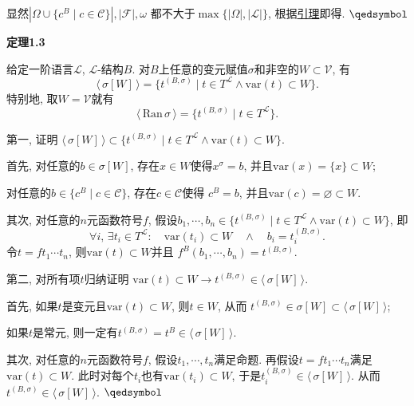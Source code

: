\documentclass[UTF8]{ctexart}
\begin{document}
显然$|\Omega\cup\{c^B\mid c\in\mathcal{C}\}|, |\mathcal{F}|, \omega$
都不大于$\max\{|\Omega|,|\mathcal{L}|\}$,
根据\href{../../01 一阶语言/01 一阶语言#nameddest=sec:定理A1.1}{引理}即得.
\hfill $\qedsymbol$

\vspace{10pt}

\hypertarget{sec:定理1.3}{}
\noindent\textbf{定理1.3}

给定一阶语言$\mathcal{L}$, $\mathcal{L}$-结构$B$.
对$B$上任意的变元赋值$\sigma$和非空的$W\subset\mathcal{V}$, 有
\[
    \langle\,\sigma[W]\,\rangle=\{t^{(B,\sigma)}\mid
    t\in T^{\mathcal{L}}\land\mathrm{var}(t)\subset W\}.
\]
特别地, 取$W=\mathcal{V}$就有
\[
    \langle\,\mathrm{Ran}\,\sigma\,\rangle=
    \{t^{(B,\sigma)}\mid t\in T^{\mathcal{L}}\}.
\]


第一, 证明
$\langle\,\sigma[W]\,\rangle\subset\{t^{(B,\sigma)}\mid
t\in T^{\mathcal{L}}\land\mathrm{var}(t)\subset W\}$.

首先, 对任意的$b\in\sigma[W]$, 存在$x\in W$使得$x^\sigma=b$,
并且$\mathrm{var}(x)=\{x\}\subset W$;

对任意的$b\in\{c^B\mid c\in\mathcal{C}\}$, 存在$c\in\mathcal{C}$使得
$c^B=b$, 并且$\mathrm{var}(c)=\varnothing\subset W$.

其次, 对任意的$n$元函数符号$f$, 假设$b_1,\cdots,b_n\in\{t^{(B,\sigma)}\mid
t\in T^{\mathcal{L}}\land\mathrm{var}(t)\subset W\}$, 即
\[
    \forall i,\,\exists t_i\in T^{\mathcal{L}}:\quad
    \mathrm{var}(t_i)\subset W\quad\land\quad b_i=t_i^{(B,\sigma)}.
\]
令$t=ft_1\cdots t_n$, 则$\mathrm{var}(t)\subset W$并且
$f^B(b_1,\cdots,b_n)=t^{(B,\sigma)}$.

第二, 对所有项$t$归纳证明
$\mathrm{var}(t)\subset W\to t^{(B,\sigma)}\in\langle\,\sigma[W]\,\rangle$.

首先, 如果$t$是变元且$\mathrm{var}(t)\subset W$, 则$t\in W$, 从而
$t^{(B,\sigma)}\in\sigma[W]\subset\langle\,\sigma[W]\,\rangle$;

如果$t$是常元, 则一定有$t^{(B,\sigma)}=t^B\in\langle\,\sigma[W]\,\rangle$.

其次, 对任意的$n$元函数符号$f$, 假设$t_1,\cdots,t_n$满足命题.
再假设$t=ft_1\cdots t_n$满足$\mathrm{var}(t)\subset W$.
此时对每个$t_i$也有$\mathrm{var}(t_i)\subset W$,
于是$t_i^{(B,\sigma)}\in\langle\,\sigma[W]\,\rangle$. 从而
$t^{(B,\sigma)}\in\langle\,\sigma[W]\,\rangle$. \hfill $\qedsymbol$
\end{document}
